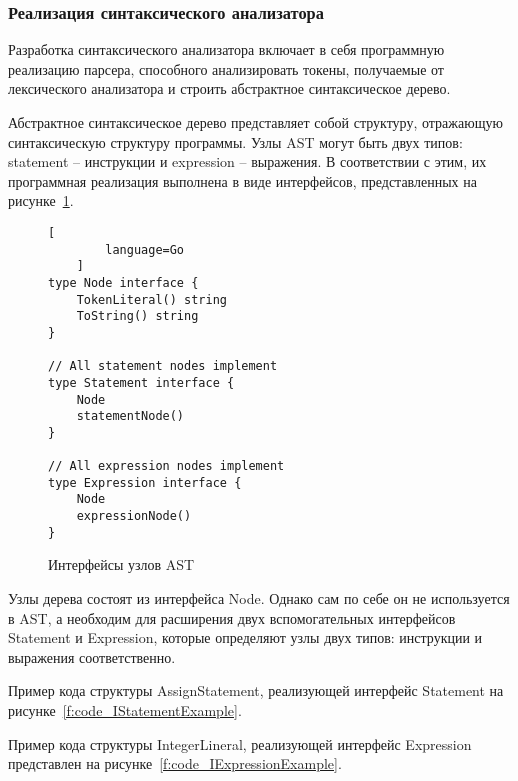 \subsubsection{Реализация синтаксического анализатора}

Разработка синтаксического анализатора включает в себя программную реализацию парсера, способного анализировать токены, получаемые от лексического анализатора и строить абстрактное синтаксическое дерево.

Абстрактное синтаксическое дерево представляет собой структуру, отражающую синтаксическую структуру программы.
Узлы AST могут быть двух типов: statement -- инструкции и expression -- выражения. 
В соответствии с этим, их программная реализация выполнена в виде интерфейсов, представленных на рисунке~\ref{f:code_astInterfaces}.

\begin{figure}[ht]
	\centering
	\vspace{\toppaddingoffigure}
	\begin{lstlisting}[
        language=Go
    ]
type Node interface {
    TokenLiteral() string
    ToString() string
}

// All statement nodes implement
type Statement interface {
    Node
    statementNode()
}

// All expression nodes implement
type Expression interface {
    Node
    expressionNode()
} 
\end{lstlisting}
	\caption{Интерфейсы узлов AST}
	\label{f:code_astInterfaces}
\end{figure}

Узлы дерева состоят из интерфейса Node.
Однако сам по себе он не используется в AST, а необходим для расширения двух вспомогательных интерфейсов Statement и Expression, которые определяют узлы двух типов: инструкции и выражения соответственно.

Пример кода структуры AssignStatement, реализующей интерфейс Statement на рисунке~\ref{f:code_IStatementExample}.

Пример кода структуры IntegerLineral, реализующей интерфейс Expression представлен на рисунке~\ref{f:code_IExpressionExample}.

